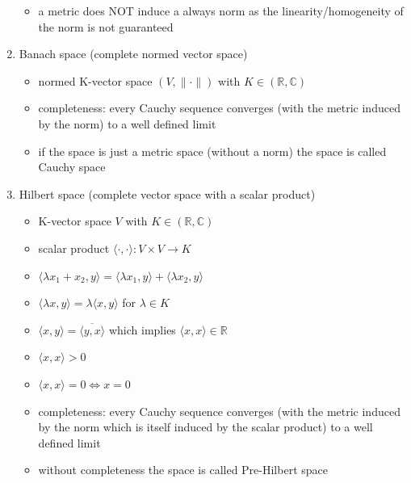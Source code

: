 \documentclass[10pt,a4paper]{article}
\theoremstyle{definition}
\begin{document}
\begin{enumerate}
\begin{itemize}
            \item a metric does NOT induce a always norm as the linearity/homogeneity of the norm is not guaranteed 
        \end{itemize}
    \item Banach space (complete normed vector space)
        \begin{itemize}
            \item normed K-vector space $(V,\|\cdot\|)$ with $K\in(\mathbb{R}, \mathbb{C})$
            \item completeness: every Cauchy sequence converges (with the metric induced by the norm) to a well defined limit
            \item if the space is just a metric space (without a norm) the space is called Cauchy space
        \end{itemize}
    \item Hilbert space (complete vector space with a scalar product)
        \begin{itemize}
            \item K-vector space $V$ with $K\in(\mathbb{R}, \mathbb{C})$
            \item scalar product $\langle\cdot,\cdot\rangle:V\times V\rightarrow K$
            \item $\langle \lambda x_1+x_2,y\rangle = \langle \lambda x_1,y\rangle + \langle \lambda x_2,y\rangle$
            \item $\langle \lambda x,y\rangle = \lambda\langle x,y\rangle$ for $\lambda\in K$
            \item $\langle x,y\rangle=\overline{\langle y,x\rangle}$ which implies $\langle x,x\rangle \in \mathbb{R}$
            \item $\langle x,x\rangle>0$
            \item $\langle x,x\rangle=0\Leftrightarrow x=0$
            \item completeness: every Cauchy sequence converges (with the metric induced by the norm which is itself induced by the scalar product) to a well defined limit
            \item without completeness the space is called Pre-Hilbert space
        \end{itemize}
\end{enumerate}
\end{document}
